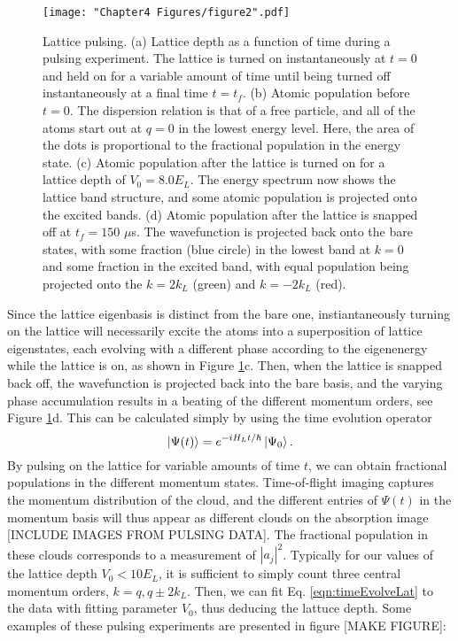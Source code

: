 \begin{figure}
\texttt{[image: "Chapter4 Figures/figure2".pdf]}
\caption{Lattice pulsing. (a) Lattice depth as a function of time during a pulsing experiment. The lattice is turned on instantaneously at $t=0$ and held on for a variable amount of time until being turned off instantaneously at a final time $t=t_f$. (b) Atomic population before $t=0$. The dispersion relation is that of a free particle, and all of the atoms start out at $q=0$ in the lowest energy level. Here, the area of the dots is proportional to the fractional population in the energy state. (c) Atomic population after the lattice is turned on for a lattice depth of $V_0 = 8.0 E_L$. The energy spectrum now shows the lattice band structure, and some atomic population is projected onto the excited bands. (d) Atomic population after the lattice is snapped off at $t_f = 150$ $\mu$s. The wavefunction is projected back onto the bare states, with some fraction (blue circle) in the lowest band at $k=0$ and some fraction in the excited band, with equal population being projected onto the $k = 2 k_L$ (green) and $k=-2k_L$ (red). }
\label{fig:pulsingSchematic}
\end{figure}
Since the lattice eigenbasis is distinct from the bare one, instiantaneously turning on the lattice will necessarily excite the atoms into a superposition of lattice eigenstates, each evolving with a different phase according to the eigenenergy while the lattice is on, as shown in  Figure \ref{fig:pulsingSchematic}c. Then, when the lattice is snapped back off, the wavefunction is projected back into the bare basis, and the varying phase accumulation results in a beating of the different momentum orders, see  Figure \ref{fig:pulsingSchematic}d. This can be calculated simply by using the time evolution operator
\begin{equation}
\mathinner{|{\Psi(t)}\rangle} = e^{-i H_L t/\hbar}\mathinner{|{\Psi_0}\rangle}.
\label{eqn:timeEvolveLat}
\end{equation}
By pulsing on the lattice for variable amounts of time $t$, we can obtain fractional populations in the different momentum states. Time-of-flight imaging captures the momentum distribution of the cloud, and the different entries of $\Psi(t)$ in the momentum basis will thus appear as different clouds on the absorption image [INCLUDE IMAGES FROM PULSING DATA]. The fractional population in these clouds corresponds to a measurement of $|a_j|^2$.  Typically for our values of the lattice depth $V_0 < 10 E_L$, it is sufficient to simply count three central momentum orders, $k = q, q \pm 2 k_L$. Then, we can fit Eq. \ref{eqn:timeEvolveLat} to the data with fitting parameter $V_0$, thus deducing the lattuce depth. Some examples of these pulsing experiments are presented in figure [MAKE FIGURE]:

